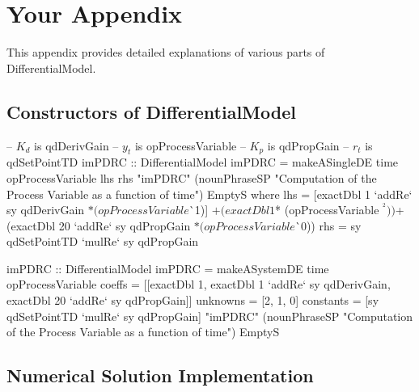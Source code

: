 \chapter{Your Appendix}
\label{appendix_a}

This appendix provides detailed explanations of various parts of DifferentialModel.

\section{Constructors of DifferentialModel}
\label{const_de}

\begin{haskell1}
-- $K_d$ is qdDerivGain
-- $y_t$ is opProcessVariable
-- $K_p$ is qdPropGain
-- $r_t$ is qdSetPointTD
imPDRC :: DifferentialModel
imPDRC = makeASingleDE
	time
	opProcessVariable
	lhs
	rhs
	"imPDRC"
	(nounPhraseSP "Computation of the Process Variable as a function of time")
	EmptyS
	where 
	lhs = [exactDbl 1 `addRe` sy qdDerivGain $* (opProcessVariable $^^ 1)]
	$+ (exactDbl 1 $* (opProcessVariable $^^ 2))
	$+ (exactDbl 20 `addRe` sy qdPropGain $* (opProcessVariable $^^ 0))
	rhs = sy qdSetPointTD `mulRe` sy qdPropGain
\end{haskell1}

\begin{haskell1}
imPDRC :: DifferentialModel
imPDRC = makeASystemDE
	time
	opProcessVariable
	coeffs = [[exactDbl 1, exactDbl 1 `addRe` sy qdDerivGain, exactDbl 20 `addRe` sy qdPropGain]]
	unknowns = [2, 1, 0]
	constants = [sy qdSetPointTD `mulRe` sy qdPropGain]
	"imPDRC"
	(nounPhraseSP "Computation of the Process Variable as a function of time")
	EmptyS
\end{haskell1}

\section{Numerical Solution Implementation}
\label{numsol}

